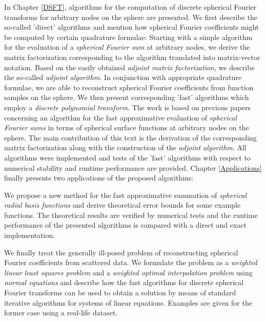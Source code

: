 In Chapter \ref{DSFT}, algorithms for the computation of discrete
spherical Fourier transforms for arbitrary nodes on the sphere 
are presented. We first describe the so-called 'direct' algorithms 
and mention how spherical Fourier coefficients might be computed 
by certain quadrature formulae: Starting with a simple algorithm 
for the evaluation of a \emph{spherical Fourier sum} at arbitrary 
nodes, we derive the matrix factorization corresponding to the 
algorithm translated into matrix-vector notation. Based on the 
easily obtained \emph{adjoint matrix factorization}, we 
describe the so-called \emph{adjoint algorithm}. In conjunction
with appropriate quadrature formulae, we are able to reconstruct
spherical Fourier coefficients from function samples on the sphere.
We then present corresponding 'fast' algorithms which employ a
\emph{discrete polynomial transform}. The work is based on 
previous papers concerning an algorithm for 
the fast approximative evaluation of \emph{spherical Fourier sums} 
in terms of spherical surface functions at arbitrary nodes on the 
sphere. The main contribution of this text is the derivation of the corresponding
matrix factorization along with the construction of the 
\emph{adjoint algorithm}. All algorithms were implemented and tests 
of the 'fast' algorithms with respect to numerical stability and 
runtime performance are provided.
Chapter \ref{Applications} finally presents two applications of the 
proposed algorithms: 

We propose a new method for the fast 
approximative summation of \emph{spherical radial basis functions}
and derive theoretical error bounds for some example functions. The 
theoretical results are verified by numerical tests and the runtime
performance of the presented algorithms is compared with a direct
and exact implementation.

We finally treat the generally ill-posed problem of reconstructing 
spherical Fourier coefficients from scattered data. We formulate
the problem as a \emph{weighted linear least squares problem}
and a \emph{weighted optimal interpolation problem} using
\emph{normal equations} and describe how the fast algorithms
for discrete spherical Fourier transforms can be used to obtain 
a solution by means of standard iterative algorithms for systems 
of linear equations. Examples are given for the former case using 
a real-life dataset.


